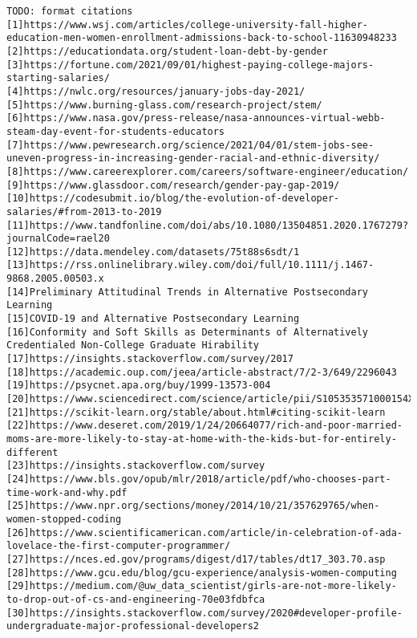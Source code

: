 \documentclass[review]{elsarticle}
\begin{document}
\begin{lstlisting}
TODO: format citations
[1]https://www.wsj.com/articles/college-university-fall-higher-education-men-women-enrollment-admissions-back-to-school-11630948233
[2]https://educationdata.org/student-loan-debt-by-gender
[3]https://fortune.com/2021/09/01/highest-paying-college-majors-starting-salaries/
[4]https://nwlc.org/resources/january-jobs-day-2021/
[5]https://www.burning-glass.com/research-project/stem/
[6]https://www.nasa.gov/press-release/nasa-announces-virtual-webb-steam-day-event-for-students-educators
[7]https://www.pewresearch.org/science/2021/04/01/stem-jobs-see-uneven-progress-in-increasing-gender-racial-and-ethnic-diversity/
[8]https://www.careerexplorer.com/careers/software-engineer/education/
[9]https://www.glassdoor.com/research/gender-pay-gap-2019/
[10]https://codesubmit.io/blog/the-evolution-of-developer-salaries/#from-2013-to-2019
[11]https://www.tandfonline.com/doi/abs/10.1080/13504851.2020.1767279?journalCode=rael20
[12]https://data.mendeley.com/datasets/75t88s6sdt/1
[13]https://rss.onlinelibrary.wiley.com/doi/full/10.1111/j.1467-9868.2005.00503.x
[14]Preliminary Attitudinal Trends in Alternative Postsecondary Learning
[15]COVID-19 and Alternative Postsecondary Learning
[16]Conformity and Soft Skills as Determinants of Alternatively Credentialed Non-College Graduate Hirability
[17]https://insights.stackoverflow.com/survey/2017
[18]https://academic.oup.com/jeea/article-abstract/7/2-3/649/2296043
[19]https://psycnet.apa.org/buy/1999-13573-004
[20]https://www.sciencedirect.com/science/article/pii/S105353571000154X
[21]https://scikit-learn.org/stable/about.html#citing-scikit-learn
[22]https://www.deseret.com/2019/1/24/20664077/rich-and-poor-married-moms-are-more-likely-to-stay-at-home-with-the-kids-but-for-entirely-different
[23]https://insights.stackoverflow.com/survey
[24]https://www.bls.gov/opub/mlr/2018/article/pdf/who-chooses-part-time-work-and-why.pdf
[25]https://www.npr.org/sections/money/2014/10/21/357629765/when-women-stopped-coding
[26]https://www.scientificamerican.com/article/in-celebration-of-ada-lovelace-the-first-computer-programmer/
[27]https://nces.ed.gov/programs/digest/d17/tables/dt17_303.70.asp
[28]https://www.gcu.edu/blog/gcu-experience/analysis-women-computing
[29]https://medium.com/@uw_data_scientist/girls-are-not-more-likely-to-drop-out-of-cs-and-engineering-70e03fdbfca
[30]https://insights.stackoverflow.com/survey/2020#developer-profile-undergraduate-major-professional-developers2
\end{lstlisting}


\end{document}
